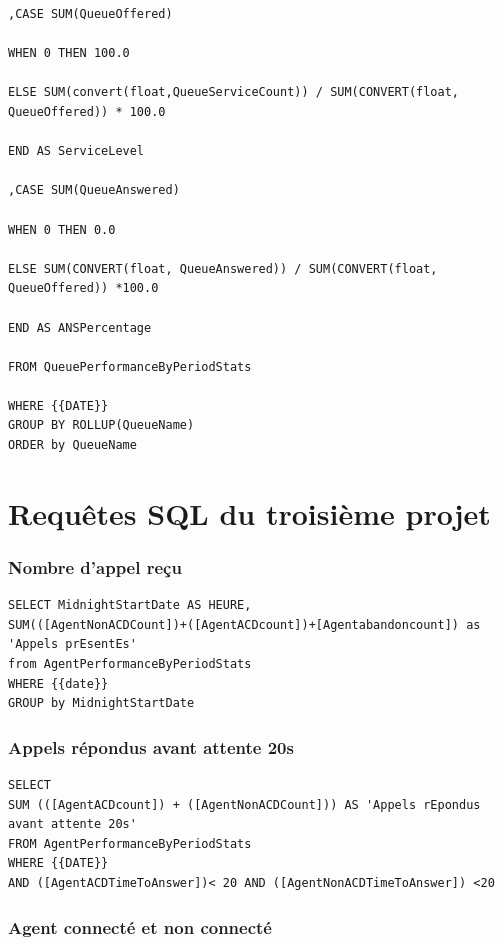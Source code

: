 \documentclass[a4paper,12pt]{report}
\begin{document}
\begin{lstlisting}
,CASE SUM(QueueOffered)

WHEN 0 THEN 100.0

ELSE SUM(convert(float,QueueServiceCount)) / SUM(CONVERT(float, QueueOffered)) * 100.0

END AS ServiceLevel

,CASE SUM(QueueAnswered)

WHEN 0 THEN 0.0

ELSE SUM(CONVERT(float, QueueAnswered)) / SUM(CONVERT(float, QueueOffered)) *100.0

END AS ANSPercentage

FROM QueuePerformanceByPeriodStats

WHERE {{DATE}}
GROUP BY ROLLUP(QueueName)
ORDER by QueueName
\end{lstlisting}



\chapter{Requêtes SQL du troisième projet}
\subsection{Nombre d'appel reçu} 

\lstset{
language=SQL,
basicstyle=\footnotesize,
}
\begin{lstlisting}
SELECT MidnightStartDate AS HEURE,
SUM(([AgentNonACDCount])+([AgentACDcount])+[Agentabandoncount]) as 'Appels prEsentEs'
from AgentPerformanceByPeriodStats
WHERE {{date}}
GROUP by MidnightStartDate        
\end{lstlisting}


\subsection{Appels répondus avant attente 20s} 

\lstset{
language=SQL,
basicstyle=\footnotesize,
}
\begin{lstlisting}
SELECT 
SUM (([AgentACDcount]) + ([AgentNonACDCount])) AS 'Appels rEpondus avant attente 20s'
FROM AgentPerformanceByPeriodStats
WHERE {{DATE}}
AND ([AgentACDTimeToAnswer])< 20 AND ([AgentNonACDTimeToAnswer]) <20        
\end{lstlisting}


\subsection{Agent connecté et non connecté } 
\end{document}
